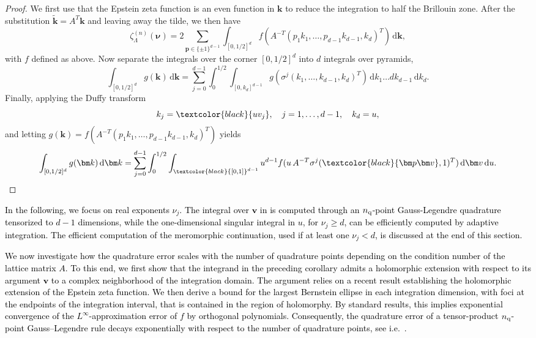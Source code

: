 \documentclass[]{amsart}
\numberwithin{mythm}{section}
\newcommand{\new}[1]{{\textcolor{black}{#1}}}
\begin{document}
\begin{proof}
    We first use that the Epstein zeta function is an even function in $\bm k$ to reduce the integration to half the Brillouin zone. After the substitution $\tilde {\bm k} = A^T\bm k$ and leaving away the tilde, we then have
    $$
    \zeta_{\Lambda}^{(n)}(\bm \nu)=2 \sum_{\bm p\in \{\pm 1\}^{d - 1} } \int_{[0,1/2]^d} f(A^{-T}(p_1 k_1, \dots ,p_{d-1} k_{d-1}, k_d)^T )\,\mathrm d \bm k,
    $$
    with $f$ defined as above.
     Now separate the integrals over the corner $[0,1/2]^d$ into $d$ integrals over pyramids,
    $$
    \int_{[0,1/2]^d} g(\bm k)\,\mathrm d \bm k =\sum_{j=0}^{d-1} \int_{0}^{1/2} \int_{[0,k_d]^{d-1}} g(\sigma^j (k_1,\dots,k_{d-1},k_d)^T) \,\mathrm d  k_1\dots  d k_{d-1} \,\mathrm d k_d.
    $$
    Finally, applying the Duffy transform
    $$
    k_j = \new{u v_j},\quad {j=1,\dots,d-1}, \quad k_d = u,
    $$
and letting $g(\bm k)=f(A^{-T}(p_1 k_1, \dots ,p_{d-1} k_{d-1}, k_d)^T )$ yields
\[
    \int_{[0,1/2]^d} g(\bm k)\,\mathrm d \bm k =\sum_{j=0}^{d-1} {\int_0^{1/2}}\int_{{\new{[0,1]}^{d-1}}}  {u^{d-1}} f(u\, A^{-T}\sigma^j ( \new{\bm p\bm v}, 1)^T )\,\mathrm d \bm v\,\mathrm d u.
 \qedhere
\]
\end{proof}

\new{In the following, we focus on real exponents $\nu_j$.}
\new{The integral over $\bm v$ in  is computed through an $n_{\rm q}$-point Gauss-Legendre quadrature tensorized to $d-1$ dimensions, while the one-dimensional singular integral in $u$, for $\nu_j \ge d$, can be efficiently computed by adaptive integration. The efficient computation of the meromorphic continuation, used if at least one $\nu_j< d$, is discussed at the end of this section.}

\new{We now investigate how the quadrature error scales with the number of quadrature points depending on the condition number of the lattice matrix $A$. To this end, we first show that the integrand in the preceding corollary admits a holomorphic extension with respect to its argument $\bm v$ to a complex neighborhood of the integration domain. The argument relies on a recent result establishing the holomorphic extension of the Epstein zeta function.
We then derive a bound for the largest Bernstein ellipse in each integration dimension, with foci at the endpoints of the integration interval, that is contained in the region of holomorphy. By standard results, this implies exponential convergence of the $L^\infty$-approximation error of $f$ by orthogonal polynomials. Consequently, the quadrature error of a tensor-product $n_{\rm q}$-point Gauss--Legendre rule decays exponentially with respect to the number of quadrature points, see i.e.~\cite[Thm.~5.3.15]{sauter2010boundary}.}
\end{document}
